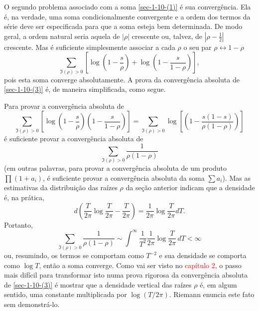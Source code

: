    O segundo problema associado com a soma 
    \eqref{sec-1-10-(1)} é sua convergência. 
    Ela é, na verdade, uma soma condicionalmente convergente e a 
    ordem dos termos da série deve ser especificada para que a 
    soma esteja bem determinada. De modo geral, a ordem natural 
    seria aquela de $|\rho|$ crescente ou, talvez, 
    de $|\rho - \frac{1}{2}|$ crescente. 
    Mas é suficiente simplesmente associar a cada 
    $\rho$ o seu par $\rho  \leftrightarrow 1 - \rho$
    \begin{equation}
        \label{sec-1-10-(3)}
        \sum_{\Im(\rho) > 0} 
        \left[ \log \left( 1 - \frac{s}{\rho} \right) + \log \left( 1 - \frac{s}{1-\rho} \right) \right],
    \end{equation}
    pois esta soma converge absolutamente. 
    A prova da convergência absoluta de \eqref{sec-1-10-(3)} é, 
    de maneira simplificada, como segue.
    
    Para provar a convergência absoluta de
    \begin{equation*}
        \sum_{\Im(\rho) > 0} \left[ \log \left( 1 - \frac{s}{\rho} \right) \left( 1 - \frac{s}{1-\rho} \right) \right]
        = \sum_{\Im(\rho) > 0} \log \left[ \left( 1 - \frac{s(1-s)}{\rho(1-\rho)} \right) \right]
    \end{equation*}
    é suficiente provar a convergência absoluta de 
    \begin{equation}
        \label{sec-1-10-(4)}
        \sum_{\Im(\rho) > 0} 
        \frac{1}{\rho(1-\rho)}
    \end{equation}
    (em outras palavras, para provar a convergência absoluta de um 
    produto $\prod (1 + a_i)$, é suficiente provar a convergência 
    absoluta da soma $\sum a_i$). Mas as estimativas da distribuição das 
    raízes $\rho$ da seção anterior indicam que a densidade é, na prática,
    \begin{equation*}
        d \left( \frac{T}{2\pi} \log \frac{T}{2\pi} - \frac{T}{2\pi} \right) = \frac{1}{2\pi} \log \frac{T}{2\pi} dT.
    \end{equation*}
    Portanto, 
    \begin{equation*}
        \sum_{\Im(\rho) > 0} \frac{1}{\rho(1-\rho)} \sim \int^{\infty} \frac{1}{T^2}\frac{1}{2\pi} \log \frac{T}{2\pi} \, dT < \infty
    \end{equation*}
    ou, resumindo, os termos se comportam como $T^{-2}$ e sua densidade se comporta como $\log T$, então a soma converge. Como vai ser visto no \textcolor{red}{capítulo 2}, o passo mais difícil para transformar isto numa prova rigorosa da convergência absoluta de \eqref{sec-1-10-(3)} é mostrar que a densidade vertical das raízes $\rho$ é, em algum sentido, uma constante multiplicada por $\log(T/2\pi)$. Riemann enuncia este fato sem demonstrá-lo.
    
